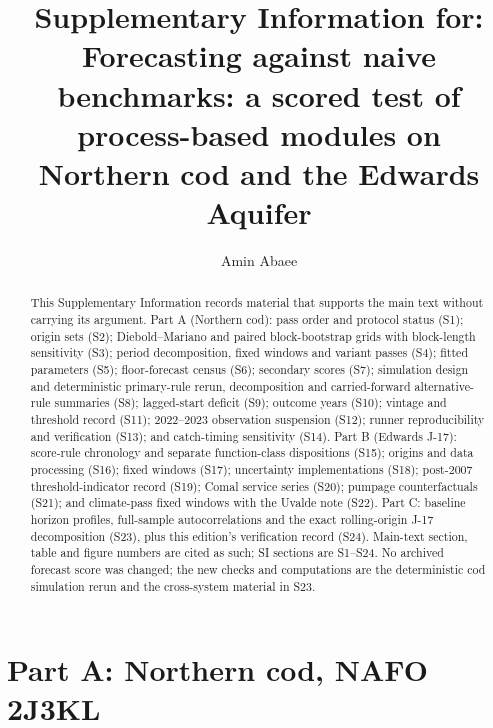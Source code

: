 \documentclass[preprint,11pt,authoryear]{elsarticle}
\theoremstyle{remark}
\begin{document}
\begin{frontmatter}
\title{Supplementary Information for:\\ Forecasting against naive benchmarks: a scored test of process-based modules on Northern cod and the Edwards Aquifer}
\author[1]{Amin Abaee}
\begin{abstract}
This Supplementary Information records material that supports the main text without carrying its argument. Part A (Northern cod): pass order and protocol status (S1); origin sets (S2); Diebold--Mariano and paired block-bootstrap grids with block-length sensitivity (S3); period decomposition, fixed windows and variant passes (S4); fitted parameters (S5); floor-forecast census (S6); secondary scores (S7); simulation design and deterministic primary-rule rerun, decomposition and carried-forward alternative-rule summaries (S8); lagged-start deficit (S9); outcome years (S10); vintage and threshold record (S11); 2022--2023 observation suspension (S12); runner reproducibility and verification (S13); and catch-timing sensitivity (S14). Part B (Edwards J-17): score-rule chronology and separate function-class dispositions (S15); origins and data processing (S16); fixed windows (S17); uncertainty implementations (S18); post-2007 threshold-indicator record (S19); Comal service series (S20); pumpage counterfactuals (S21); and climate-pass fixed windows with the Uvalde note (S22). Part C: baseline horizon profiles, full-sample autocorrelations and the exact rolling-origin J-17 decomposition (S23), plus this edition's verification record (S24). Main-text section, table and figure numbers are cited as such; SI sections are S1--S24. No archived forecast score was changed; the new checks and computations are the deterministic cod simulation rerun and the cross-system material in S23.
\end{abstract}
\end{frontmatter}

\part*{Part A: Northern cod, NAFO 2J3KL}
\end{document}
